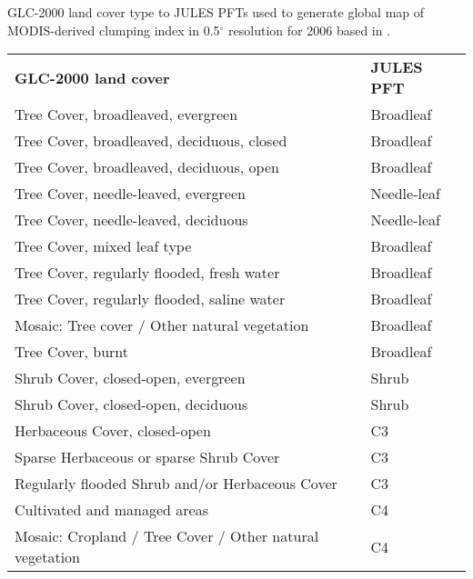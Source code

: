 \begin{threeparttable}[ht!]
\centering
\caption{GLC-2000 land cover type to JULES PFTs used to generate global map of MODIS-derived clumping index in 0.5$^{\circ}$ resolution for 2006 based in \citet{He2012}.}
\begin{tabular}{l{} l{}}
     \hline
     \hline
\textbf{GLC-2000 land cover}   & \textbf{JULES PFT}\\
\noalign{\smallskip}\hline
Tree Cover, broadleaved, evergreen                       & Broadleaf\\ 
Tree Cover, broadleaved, deciduous, closed               & Broadleaf\\
Tree Cover, broadleaved, deciduous, open                 & Broadleaf\\
Tree Cover, needle-leaved, evergreen                     & Needle-leaf\\
Tree Cover, needle-leaved, deciduous                     & Needle-leaf\\
Tree Cover, mixed leaf type                              & Broadleaf\\
Tree Cover, regularly flooded, fresh  water              & Broadleaf\\
Tree Cover, regularly flooded, saline water              & Broadleaf\\
Mosaic: Tree cover / Other natural vegetation            & Broadleaf\\
Tree Cover, burnt                                        & Broadleaf\\
Shrub Cover, closed-open, evergreen                      & Shrub\\
Shrub Cover, closed-open, deciduous                      & Shrub\\
Herbaceous Cover, closed-open                            & C3\\
Sparse Herbaceous or sparse Shrub Cover                  & C3\\
Regularly flooded Shrub and/or Herbaceous Cover          & C3\\
Cultivated and managed areas                             & C4\\
Mosaic: Cropland / Tree Cover / Other natural vegetation & C4\\

\end{tabular}
\end{threeparttable}
